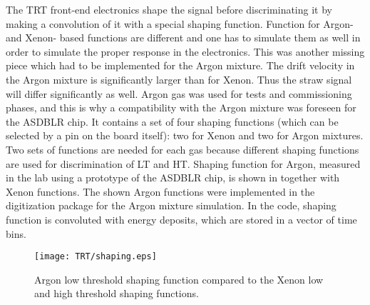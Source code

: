 
The TRT front-end electronics shape the signal before discriminating it by making a convolution of it with a special shaping function. Function for Argon- and Xenon- based functions are different and one has to simulate them as well in order to simulate the proper response in the electronics. 
This was another missing piece which had to be implemented for the Argon mixture. 
The drift velocity in the Argon mixture is significantly larger than for Xenon. Thus the straw signal will differ significantly as well.
Argon gas was used for tests and commissioning phases, and this is why a compatibility with the Argon mixture was foreseen for the ASDBLR chip. It contains a set of four shaping functions (which can be selected
by a pin on the board itself): two for Xenon and two for Argon mixtures. Two sets of functions are needed for each gas because different shaping functions are used for discrimination of LT and HT. Shaping function for Argon, measured in the lab using a prototype of the ASDBLR chip, is shown in  together with Xenon functions. The shown Argon functions were implemented in the digitization package for the Argon mixture simulation. In the code, shaping function is convoluted with energy deposits, which are stored in a vector of time bins.

\begin{figure}
\begin{center}
 \texttt{[image: TRT/shaping.eps]}
\caption{Argon low threshold shaping function compared to the Xenon low and high threshold shaping functions.}
\label{fig:shaping}
\end{center}
\end{figure}


